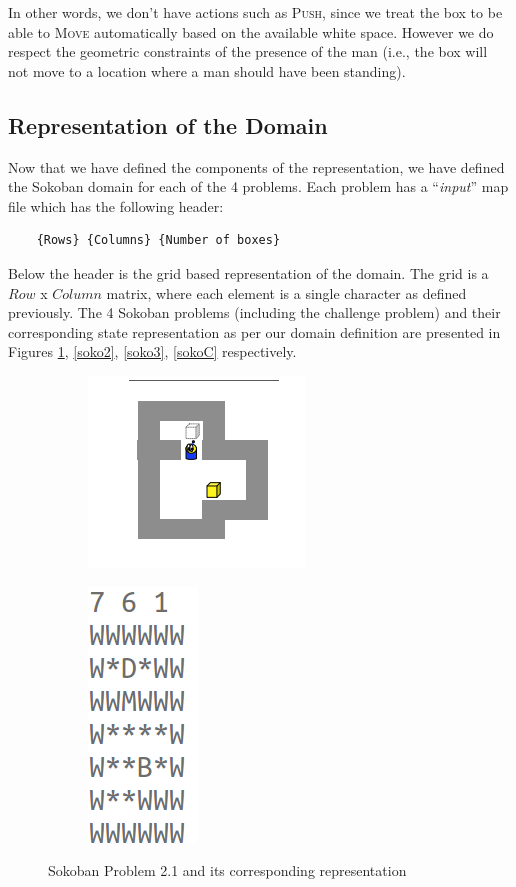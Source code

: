 \documentclass[10pt, letter]{article}
\begin{document}
In other words, we don't have actions such as \textsc{Push}, since we treat the box to be able to \textsc{Move} automatically based on the available white space. However we do respect the geometric constraints of the presence of the man (i.e., the box will not move to a location where a man should have been standing).
\subsection*{Representation of the Domain}
Now that we have defined the components of the representation, we have defined the Sokoban domain for each of the 4 problems. Each problem has a ``\textit{input}'' map file which has the following header:
\begin{verbatim}
	{Rows} {Columns} {Number of boxes}
\end{verbatim}
Below the header is the grid based representation of the domain. The grid is a $Row$ x $Column$ matrix, where each element is a single character as defined previously. The 4 Sokoban problems (including the challenge problem) and their corresponding state representation as per our domain definition are presented in Figures \ref{soko1}, \ref{soko2}, \ref{soko3}, \ref{sokoC} respectively.

\begin{figure} [h!]
\centering
\begin{subfigure}{.5\textwidth}
  \centering
  \includegraphics[scale = 0.5]{images/sokoban1}
\end{subfigure}%
\begin{subfigure}{.5\textwidth}
  \centering
  \includegraphics[scale = 0.5]{images/sokoban1-plan}
\end{subfigure}%
\caption{Sokoban Problem 2.1 and its corresponding representation}
\label{soko1}
\end{figure}
\end{document}
